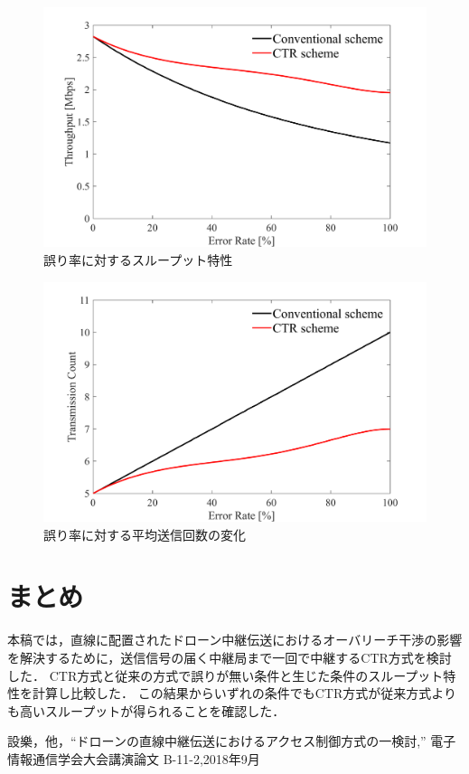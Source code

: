 \documentclass[a4paper,10pt]{ltjsarticle}
\begin{document}
\begin{figure}[H]
  \centering
  \includegraphics[width=\linewidth]{fig5.pdf} 
  \caption{誤り率に対するスループット特性}

\end{figure}
\begin{figure}[H]
  \centering
  \includegraphics[width=\linewidth]{fig6.pdf} 
  \caption{誤り率に対する平均送信回数の変化}

\end{figure}

\section{まとめ}
本稿では，直線に配置されたドローン中継伝送におけるオーバリーチ干渉の影響を解決するために，送信信号の届く中継局まで一回で中継するCTR方式を検討した．
CTR方式と従来の方式で誤りが無い条件と生じた条件のスループット特性を計算し比較した．
この結果からいずれの条件でもCTR方式が従来方式よりも高いスループットが得られることを確認した．

\begin{thebibliography}{99}
  設樂，他，“ドローンの直線中継伝送におけるアクセス制御方式の一検討,” 電子情報通信学会大会講演論文 B-11-2,2018年9月
\end{thebibliography}

%
\end{document}
